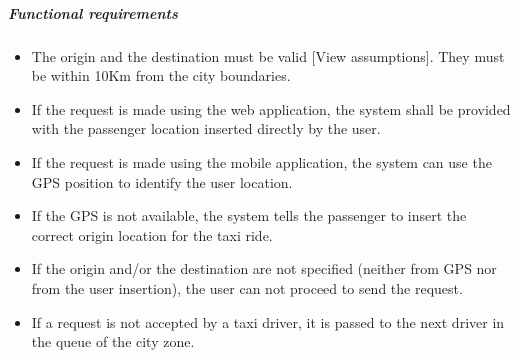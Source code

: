 \subparagraph{Functional requirements}
\noindent
	\begin{itemize}
		\item The origin and the destination must be valid [View assumptions]. They must be within 10Km from the city boundaries.
		\item If the request is made using the web application, the system shall be provided with the passenger location inserted directly by the user.
		\item If the request is made using the mobile application, the system can use the GPS position to identify the user location.
		\item If the GPS is not available, the system tells the passenger to insert the correct origin location for the taxi ride.
		\item If the origin and/or the destination are not specified (neither from GPS nor from the user insertion), the user can not proceed to send the request.
		\item If a request is not accepted by a taxi driver, it is passed to the next driver in the queue of the city zone.
	\end{itemize}